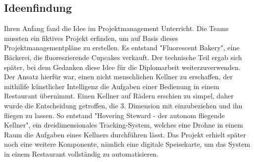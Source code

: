   \subsection{Ideenfindung}
  Ihren Anfang fand die Idee im Projektmanagement Unterricht. Die Teams mussten ein fiktives Projekt erfinden, um auf Basis dieses
  Projektmanagementpläne zu erstellen. Es entstand "Fluorescent Bakery", eine Bäckerei, die fluoreszierende Cupcakes verkauft.
  Der technische Teil ergab sich später, bei dem Gedanken diese Idee für die Diplomarbeit weiterzuverwenden. Der Ansatz hierfür war,
  einen nicht menschlichen Kellner zu erschaffen, der mithilife künstlicher Intelligenz die Aufgaben einer Bedienung in einem Restaurant übernimmt.
  Einen Kellner auf Rädern erschien zu simpel, daher wurde die Entscheidung getroffen, die 3. Dimension mit einzubeziehen und ihn fliegen zu lassen.
  So entstand "Hovering Steward - der autonom fliegende Kellner", ein dreidimensionales Tracking-System, welches eine Drohne in einem Raum die Aufgaben eines Kellners durchführen lässt.
  Das Projekt erhielt später noch eine weitere Komponente, nämlich eine digitale Speisekarte, um das System in einem Restaurant vollständig zu automatisieren.

